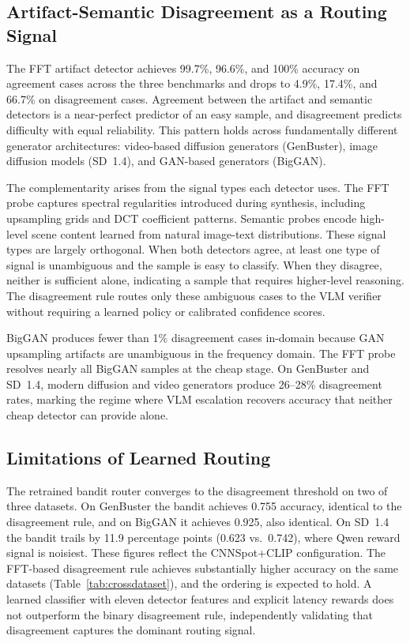 \documentclass{ieeeaccess}
\begin{document}
\subsection{Artifact-Semantic Disagreement as a Routing Signal}

The FFT artifact detector achieves 99.7\%, 96.6\%, and 100\% accuracy on agreement
cases across the three benchmarks and drops to 4.9\%, 17.4\%, and 66.7\% on
disagreement cases. Agreement between the artifact and semantic detectors is a
near-perfect predictor of an easy sample, and disagreement predicts difficulty with
equal reliability. This pattern holds across fundamentally different generator
architectures: video-based diffusion generators (GenBuster), image diffusion models
(SD~1.4), and GAN-based generators (BigGAN).

The complementarity arises from the signal types each detector uses. The FFT probe
captures spectral regularities introduced during synthesis, including upsampling grids
and DCT coefficient patterns. Semantic probes encode high-level scene content learned
from natural image-text distributions. These signal types are largely orthogonal.
When both detectors agree, at least one type of signal is unambiguous and the sample
is easy to classify. When they disagree, neither is sufficient alone, indicating a
sample that requires higher-level reasoning. The disagreement rule routes only these
ambiguous cases to the VLM verifier without requiring a learned policy or calibrated
confidence scores.

BigGAN produces fewer than 1\% disagreement cases in-domain because GAN upsampling
artifacts are unambiguous in the frequency domain. The FFT probe resolves nearly all
BigGAN samples at the cheap stage. On GenBuster and SD~1.4, modern diffusion and
video generators produce 26--28\% disagreement rates, marking the regime where VLM
escalation recovers accuracy that neither cheap detector can provide alone.

\subsection{Limitations of Learned Routing}
The retrained bandit router converges to the disagreement threshold on two of three
datasets. On GenBuster the bandit achieves 0.755 accuracy, identical to the
disagreement rule, and on BigGAN it achieves 0.925, also identical. On SD~1.4 the
bandit trails by 11.9 percentage points (0.623 vs.\ 0.742), where Qwen reward signal
is noisiest. These figures reflect the CNNSpot+CLIP configuration. The FFT-based
disagreement rule achieves substantially higher accuracy on the same datasets
(Table~\ref{tab:crossdataset}), and the ordering is expected to hold. A learned
classifier with eleven detector features and explicit latency rewards does not
outperform the binary disagreement rule, independently validating that disagreement
captures the dominant routing signal.
\end{document}
